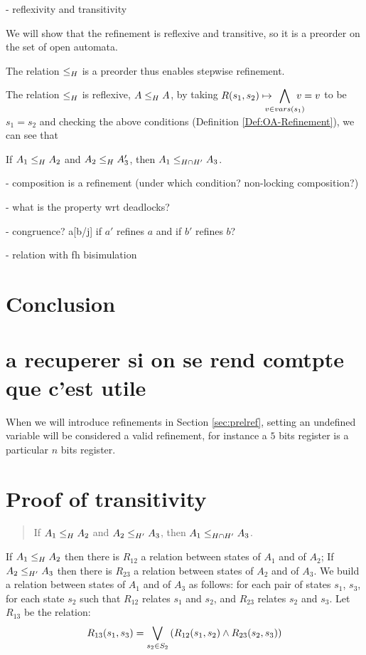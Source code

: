 \documentclass[runningheads]{llncs}
\begin{document}
- reflexivity and transitivity

We will  show  that  the  refinement  is  reflexive  and  transitive,  so  it  is  a  preorder on the set of open automata.

\begin{lemma} The relation \(\wrel{}{}{H}\) is a preorder thus enables stepwise refinement.
\end{lemma}
The relation  \(\wrel{}{}{H}\) is reflexive,  \(\wrel{A}{A}{H}\),  by taking $R\mpar{s_1, s_2} \mapsto \displaystyle\bigwedge_\subbox{v \in vars(s_1)} {v=v}$ to be $s_1= s_2$  and checking the above conditions (Definition \ref{Def:OA-Refinement}), we can see that\\


\begin{theorem}[Transitivity]
If $\wrel{A_1}{A_2}{H}$ and $\wrel{A_2}{A_3}{H}'$, then $\wrel{A_1}{A_3}{H\cap H'}$.
\end{theorem}

- composition is a refinement (under which condition? non-locking composition?)

- what is the property wrt deadlocks?

- congruence? a[b/j] if $a'$ refines $a$ and if $b'$ refines $b$?

- relation with fh bisimulation



\section{Conclusion}\label{sec:ccl}


\section{a recuperer si on se rend comtpte que c'est utile}
When we will introduce refinements in Section \ref{sec:prelref}, setting an undefined variable will be considered a valid refinement, for instance a \(5\) bits register is a particular \(n\) bits register.


\appendix
\section{Proof of transitivity}
\begin{quote}
If $\wrel{A_1}{A_2}{H}$ and $\wrel{A_2}{A_3}{H'}$, then $\wrel{A_1}{A_3}{H\cap H'}$.
\end{quote}
\proof 
If $\wrel{A_1}{A_2}{H}$ then there is $R_{12}$ a relation between states
of $A_1$ and of $A_2$;  If $\wrel{A_2}{A_3}{H'}$ then there is $R_{23}$ a relation between states of $A_2$ and of $A_3$. We build a relation between
 states of $A_1$ and of $A_3$ as follows:  for each pair of states $s_1$, $s_3$, for each state $s_2$ such that $R_{12}$ relates $s_1$ and $s_2$, and $R_{23}$ relates $s_2$ and $s_3$.
Let $R_{13}$ be the relation:\\
  \[R_{13}(s_1,s_3)=\bigvee_{s_2\in S_2}\mpar{R_{12}(s_1,s_2) \land R_{23}(s_2,s_3) } \]
\end{document}
